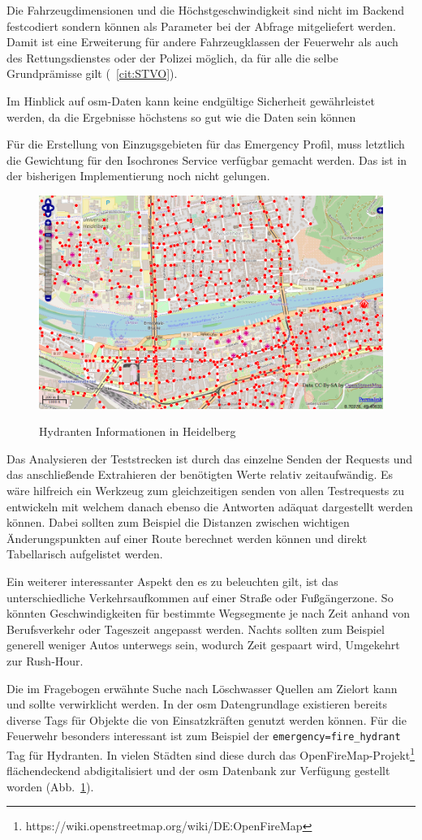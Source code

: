 Die Fahrzeugdimensionen und die Höchstgeschwindigkeit sind nicht im Backend festcodiert sondern können als Parameter bei der Abfrage mitgeliefert werden.
Damit ist eine Erweiterung für andere Fahrzeugklassen der Feuerwehr als auch des Rettungsdienstes oder der Polizei möglich, da für alle die selbe Grundprämisse gilt (~\ref{cit:STVO}).

Im Hinblick auf \gls{osm}-Daten kann keine endgültige Sicherheit gewährleistet werden, da die Ergebnisse höchstens so gut wie die Daten sein können

Für die Erstellung von Einzugsgebieten für das Emergency Profil, muss letztlich die Gewichtung für den Isochrones Service verfügbar gemacht werden.
Das ist in der bisherigen Implementierung noch nicht gelungen.

\begin{figure}[htb]
\centering
\caption{Hydranten Informationen in Heidelberg}
\label{fig:firehydrants}
\includegraphics[width = 0.80 \textwidth]{../media/firehydrants.png} \\
\end{figure}

Das Analysieren der Teststrecken ist durch das einzelne Senden der Requests und das anschließende Extrahieren der benötigten Werte relativ zeitaufwändig.
Es wäre hilfreich ein Werkzeug zum gleichzeitigen senden von allen Testrequests zu entwickeln mit welchem danach ebenso die Antworten adäquat dargestellt werden können.
Dabei sollten zum Beispiel die Distanzen zwischen wichtigen Änderungspunkten auf einer Route berechnet werden können und direkt Tabellarisch aufgelistet werden.

Ein weiterer interessanter Aspekt den es zu beleuchten gilt, ist das unterschiedliche Verkehrsaufkommen auf einer Straße oder Fußgängerzone.
So könnten Geschwindigkeiten für bestimmte Wegsegmente je nach Zeit anhand von Berufsverkehr oder Tageszeit angepasst werden.
Nachts sollten zum Beispiel generell weniger Autos unterwegs sein, wodurch Zeit gespaart wird, Umgekehrt zur Rush-Hour.


Die im Fragebogen erwähnte Suche nach Löschwasser Quellen am Zielort kann und sollte verwirklicht werden.
In der \gls{osm} Datengrundlage existieren bereits diverse Tags für Objekte die von Einsatzkräften genutzt werden können.
Für die Feuerwehr besonders interessant ist zum Beispiel der \texttt{emergency=fire\_hydrant} Tag für Hydranten.
In vielen Städten sind diese durch das OpenFireMap-Projekt\footnote{https://wiki.openstreetmap.org/wiki/DE:OpenFireMap} flächendeckend abdigitalisiert und der \gls{osm} Datenbank zur Verfügung gestellt worden (Abb.~\ref{fig:firehydrants}).